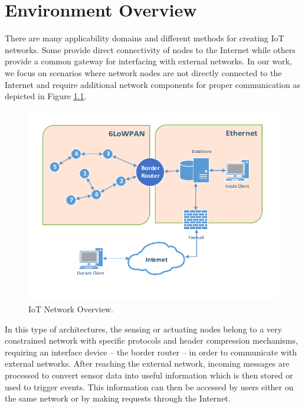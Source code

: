 
\chapter{Environment Overview}
\label{sec:network_overview}
There are many applicability domains and different methods for creating \gls{IoT} networks. 
Some provide direct connectivity of nodes to the Internet while others provide a common gateway for interfacing with external networks. 
In our work, we focus on scenarios where network nodes are not directly connected to the Internet and require additional network components for proper communication as depicted in Figure \ref{fig:net_overview}.

\begin{figure}[h]
  \centering
  \includegraphics[width=0.8\linewidth]{figures/Network_Overview.pdf}
  \caption{IoT Network Overview.}
  \label{fig:net_overview}
\end{figure}

In this type of architectures, the sensing or actuating nodes belong to a very constrained network with specific protocols and header compression mechanisms, requiring an interface device -- the border router -- in order to communicate with external networks.
After reaching the external network, incoming messages are processed to convert sensor data into useful information which is then stored or used to trigger events. 
This information can then be accessed by users either on the same network or by making requests through the Internet. 


